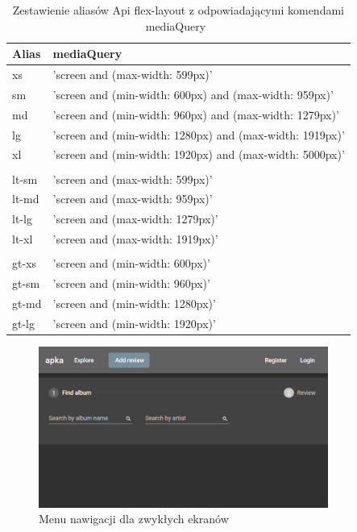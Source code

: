 		\begin{table}[ht]
			\centering
			\caption{Zestawienie aliasów Api flex-layout z odpowiadającymi komendami mediaQuery~\cite{flexLayout}}
			\label{tab:flexLayoutApi}
			\begin{tabular}{|ll|} \hline
				Alias & mediaQuery \\ \hline\hline
				xs	&	'screen and (max-width: 599px)'	\\
				sm	&	'screen and (min-width: 600px) and (max-width: 959px)'	\\
				md	&	'screen and (min-width: 960px) and (max-width: 1279px)'	\\
				lg	&	'screen and (min-width: 1280px) and (max-width: 1919px)'	\\
				xl	&	'screen and (min-width: 1920px) and (max-width: 5000px)'	\\
					&		\\
				lt-sm	&	'screen and (max-width: 599px)'	\\
				lt-md	&	'screen and (max-width: 959px)'	\\
				lt-lg	&	'screen and (max-width: 1279px)'	\\
				lt-xl	&	'screen and (max-width: 1919px)'	\\
					&		\\
				gt-xs	&	'screen and (min-width: 600px)'	\\
				gt-sm	&	'screen and (min-width: 960px)'	\\
				gt-md	&	'screen and (min-width: 1280px)'	\\
				gt-lg	&	'screen and (min-width: 1920px)'	\\
				\hline
			\end{tabular}
		\end{table}

		\begin{figure}[ht]
			\centering
				\includegraphics[height=200px]{rys05/gt-xs.png}
			 \caption{Menu nawigacji dla zwykłych ekranów}
			 \label{fig:gt-xs}
		\end{figure}


